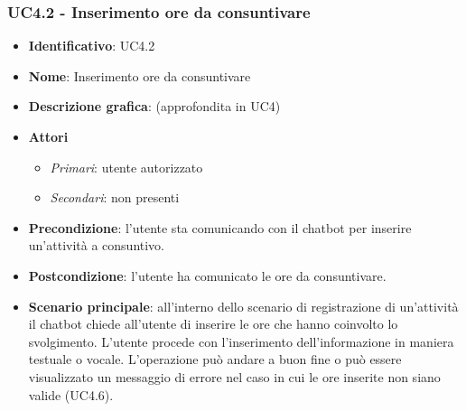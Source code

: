 \subsubsection{UC4.2 - Inserimento ore da consuntivare}
\begin{itemize}
    \item \textbf{Identificativo}: UC4.2 
    \item \textbf{Nome}: Inserimento ore da consuntivare  
    \item \textbf{Descrizione grafica}: (approfondita in UC4)
    \item \textbf{Attori}
        \begin{itemize} 
            \item \textit{Primari}: utente autorizzato
            \item \textit{Secondari}: non presenti
        \end{itemize}
    \item \textbf{Precondizione}: l'utente sta comunicando con il chatbot per inserire un'attività a consuntivo. 
    \item \textbf{Postcondizione}: l'utente ha comunicato le ore da consuntivare. 
    \item \textbf{Scenario principale}: all'interno dello scenario di registrazione di un'attività il chatbot chiede all'utente di inserire le ore che hanno coinvolto lo svolgimento. L'utente procede con l'inserimento dell'informazione in maniera testuale o vocale. L'operazione può andare a buon fine o può essere visualizzato un messaggio di errore nel caso in cui le ore inserite non siano valide (UC4.6).
\end{itemize}
\newpage

